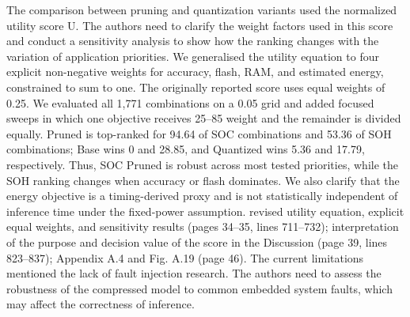 {}
\markdownRendererSectionEnd \markdownRendererSectionBegin
{}\markdownRendererInterblockSeparator
{}\markdownRendererBlockQuoteBegin
The comparison between pruning and quantization variants used the normalized utility score U. The authors need to clarify the weight factors used in this score and conduct a sensitivity analysis to show how the ranking changes with the variation of application priorities.\markdownRendererBlockQuoteEnd \markdownRendererInterblockSeparator
{} We generalised the utility equation to four explicit non-negative weights for accuracy, flash, RAM, and estimated energy, constrained to sum to one. The originally reported score uses equal weights of 0.25. We evaluated all 1,771 combinations on a 0.05 grid and added focused sweeps in which one objective receives 25--85\markdownRendererPercentSign{} weight and the remainder is divided equally. Pruned is top-ranked for 94.64\markdownRendererPercentSign{} of SOC combinations and 53.36\markdownRendererPercentSign{} of SOH combinations; Base wins 0\markdownRendererPercentSign{} and 28.85\markdownRendererPercentSign{}, and Quantized wins 5.36\markdownRendererPercentSign{} and 17.79\markdownRendererPercentSign{}, respectively. Thus, SOC Pruned is robust across most tested priorities, while the SOH ranking changes when accuracy or flash dominates. We also clarify that the energy objective is a timing-derived proxy and is not statistically independent of inference time under the fixed-power assumption.\markdownRendererParagraphSeparator
{} revised utility equation, explicit equal weights, and sensitivity results (pages 34--35, lines 711--732); interpretation of the purpose and decision value of the score in the Discussion (page 39, lines 823--837); Appendix A.4 and Fig. A.19 (page 46).\markdownRendererInterblockSeparator
{}
\markdownRendererSectionEnd \markdownRendererSectionBegin
{}\markdownRendererInterblockSeparator
{}\markdownRendererBlockQuoteBegin
The current limitations mentioned the lack of fault injection research. The authors need to assess the robustness of the compressed model to common embedded system faults, which may affect the correctness of inference.\markdownRendererBlockQuoteEnd \markdownRendererInterblockSeparator
